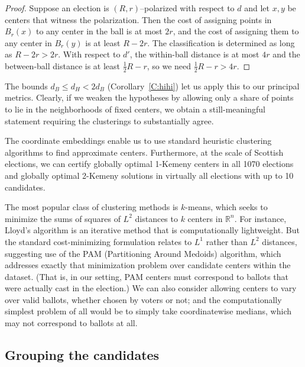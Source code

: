 \documentclass{amsart}
\newcommand{\R}{\mathbb{R}}
\theoremstyle{plain}
\theoremstyle{definition}
\theoremstyle{remark}
\begin{document}
\begin{proof}
Suppose an election is $(R,r)$--polarized with respect to $d$ and let $x,y$ be centers that witness the polarization.  Then the cost of assigning points in $B_r(x)$ to any center in the ball is at most $2r$, and the cost of assigning them to any center in $B_r(y)$ is at least $R-2r$.  The classification is determined as long as $R-2r>2r$.  With respect to $d'$, the within-ball distance is at most $4r$ and the between-ball distance is at least $\frac 12 R-r$, so we need 
$\frac 12 R-r>4r$.   
\end{proof}

The bounds $d_B\le d_H<2d_B$ (Corollary~\ref{C:hihi}) let us apply this to our principal metrics.
Clearly, if we weaken the hypotheses by allowing only a share of points to lie in the neighborhoods of fixed centers, we obtain a still-meaningful statement requiring the clusterings to substantially agree.

The coordinate embeddings enable us to use standard heuristic clustering  algorithms to find approximate centers.  Furthermore, at the scale of Scottish elections, we can certify globally optimal 1-Kemeny centers in all 1070 elections and globally optimal 2-Kemeny solutions in virtually all elections with up to 10 candidates.  

The most popular class of clustering methods is $k$-means, which seeks to minimize the sums of squares of $L^2$ distances to $k$ centers in $\R^n$.  
For instance, Lloyd's algorithm is an iterative method that is computationally lightweight.  But the standard cost-minimizing formulation relates to $L^1$ rather than $L^2$ distances, suggesting use of the PAM (Partitioning Around Medoids) algorithm, which addresses exactly that minimization problem over candidate centers within the dataset. (That is, in our setting, PAM centers must correspond to ballots that were actually cast in the election.)  We can also consider allowing centers to vary over valid ballots, whether chosen by voters or not; and the computationally simplest problem of all would be to simply take coordinatewise medians, which may not correspond to ballots at all.



\subsection{Grouping the candidates}\label{subsec:agglom}
\end{document}

